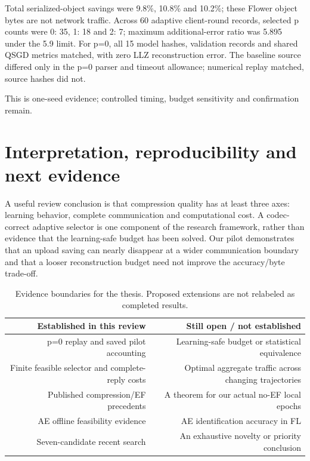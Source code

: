 Total serialized-object savings were 9.8\%, 10.8\% and 10.2\%; these Flower object bytes are not network traffic. Across 60 adaptive client-round records, selected p counts were 0: 35, 1: 18 and 2: 7; maximum additional-error ratio was 5.895 under the 5.9 limit. For p=0, all 15 model hashes, validation records and shared QSGD metrics matched, with zero LLZ reconstruction error. The baseline source differed only in the p=0 parser and timeout allowance; numerical replay matched, source hashes did not.

This is one-seed evidence; controlled timing, budget sensitivity and confirmation remain.

\section{Interpretation, reproducibility and next evidence}

A useful review conclusion is that compression quality has at least three axes: learning behavior, complete communication and computational cost. A codec-correct adaptive selector is one component of the research framework, rather than evidence that the learning-safe budget has been solved. Our pilot demonstrates that an upload saving can nearly disappear at a wider communication boundary and that a looser reconstruction budget need not improve the accuracy/byte trade-off.

\begin{table}[htbp]
\centering
\small
\begin{tabularx}{\textwidth}{R{0.98000}R{1.02000}}
\toprule
\textbf{Established in this review} & \textbf{Still open / not established} \\\midrule
p=0 replay and saved pilot accounting & Learning-safe budget or statistical equivalence \\
Finite feasible selector and complete-reply costs & Optimal aggregate traffic across changing trajectories \\
Published compression/EF precedents & A theorem for our actual no-EF local epochs \\
AE offline feasibility evidence & AE identification accuracy in FL \\
Seven-candidate recent search & An exhaustive novelty or priority conclusion \\
\bottomrule
\end{tabularx}
\caption{Evidence boundaries for the thesis. Proposed extensions are not relabeled as completed results.}
\label{tab:evidence}
\end{table}


